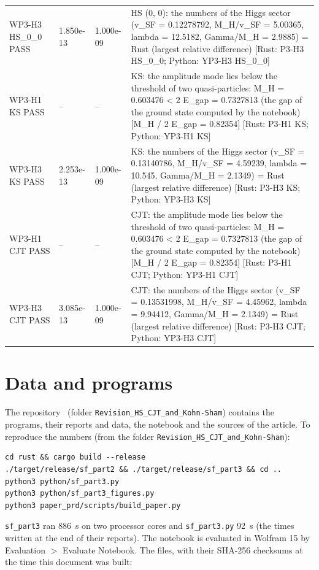 \documentclass[aps,prd,onecolumn,superscriptaddress,nofootinbib,floatfix,longbibliography]{revtex4-2}
\begin{document}
\begin{longtable}{p{}p{}p{}p{}}
WP3-H3 HS\_0\_0 \newline PASS & 1.850e-13 & 1.000e-09 & HS (0, 0): the numbers of the Higgs sector (v\_SF = 0.12278792, M\_H/v\_SF = 5.00365, lambda = 12.5182, Gamma/M\_H = 2.9885) = Rust (largest relative difference) [Rust: P3-H3 HS\_0\_0; Python: YP3-H3 HS\_0\_0] \\
WP3-H1 KS \newline PASS & -- & -- & KS: the amplitude mode lies below the threshold of two quasi-particles: M\_H = 0.603476 \textless{} 2 E\_gap = 0.7327813 (the gap of the ground state computed by the notebook) [M\_H / 2 E\_gap = 0.82354] [Rust: P3-H1 KS; Python: YP3-H1 KS] \\
WP3-H3 KS \newline PASS & 2.253e-13 & 1.000e-09 & KS: the numbers of the Higgs sector (v\_SF = 0.13140786, M\_H/v\_SF = 4.59239, lambda = 10.545, Gamma/M\_H = 2.1349) = Rust (largest relative difference) [Rust: P3-H3 KS; Python: YP3-H3 KS] \\
WP3-H1 CJT \newline PASS & -- & -- & CJT: the amplitude mode lies below the threshold of two quasi-particles: M\_H = 0.603476 \textless{} 2 E\_gap = 0.7327813 (the gap of the ground state computed by the notebook) [M\_H / 2 E\_gap = 0.82354] [Rust: P3-H1 CJT; Python: YP3-H1 CJT] \\
WP3-H3 CJT \newline PASS & 3.085e-13 & 1.000e-09 & CJT: the numbers of the Higgs sector (v\_SF = 0.13531998, M\_H/v\_SF = 4.45962, lambda = 9.94412, Gamma/M\_H = 2.1349) = Rust (largest relative difference) [Rust: P3-H3 CJT; Python: YP3-H3 CJT] \\
\end{longtable}
\endgroup

\section{Data and programs}
\label{sec:data}

The repository~\cite{Repo} (folder \texttt{Revision\_HS\_CJT\_and\_Kohn-Sham}) contains the programs, their reports and data, the notebook
and the sources of the article. To reproduce the numbers (from the folder \texttt{Revision\_HS\_CJT\_and\_Kohn-Sham}):
\begin{verbatim}
cd rust && cargo build --release
./target/release/sf_part2 && ./target/release/sf_part3 && cd ..
python3 python/sf_part3.py
python3 python/sf_part3_figures.py
python3 paper_prd/scripts/build_paper.py
\end{verbatim}
\texttt{sf\_part3} ran 886~s on two processor cores and \texttt{sf\_part3.py} 92~s (the times written at the end of their reports). The notebook is evaluated
in Wolfram 15 by Evaluation $>$ Evaluate Notebook. The files, with their SHA-256 checksums at the time this document was built:
\end{document}
